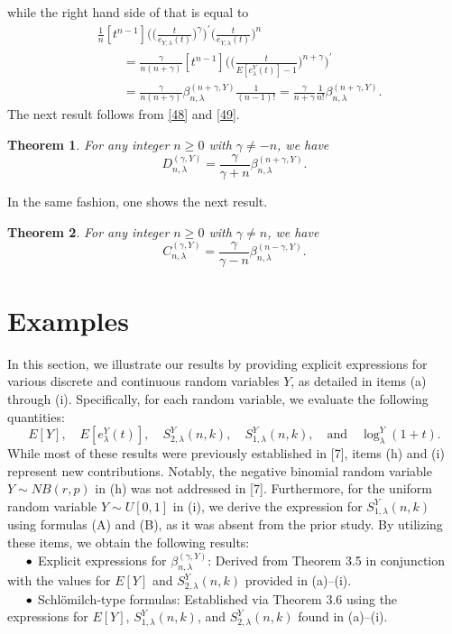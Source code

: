 \documentclass[a4paper,11pt]{amsart}
\newtheorem{theorem}{Theorem}[section]
\begin{document}
while the right hand side of that is equal to
\begin{equation} \label{49}
\begin{aligned}
&\frac{1}{n}[t^{n-1}]\bigg(\bigg(\frac{t}{e_{Y,\lambda}(t)}\bigg)^{\gamma}\bigg)^{\prime}\bigg(\frac{t}{e_{Y,\lambda}(t)}\bigg)^{n} \\
&\quad\quad =\frac{\gamma}{n(n+\gamma)}[t^{n-1}]\bigg(\bigg(\frac{t}{E[e_{\lambda}^{Y}(t)]-1}\bigg)^{n+\gamma}\bigg)^{\prime} \\
&\quad\quad=\frac{\gamma}{n(n+\gamma)}\beta_{n,\lambda}^{(n+\gamma,Y)}\frac{1}{(n-1)!}=\frac{\gamma}{n+\gamma}\frac{1}{n!}\beta_{n,\lambda}^{(n+\gamma,Y)}.
\end{aligned}
\end{equation}
The next result follows from \eqref{48} and \eqref{49}.
\begin{theorem}
For any integer $n \ge 0$ with $\gamma \ne - n$, we have
\begin{equation*}
D_{n,\lambda}^{(\gamma,Y)}=\frac{\gamma}{\gamma+n}\beta_{n,\lambda}^{(n+\gamma,Y)}.
\end{equation*}
\end{theorem}
In the same fashion, one shows the next result.
\begin{theorem}
For any integer $n \ge 0$ with $\gamma \ne n$, we have
\begin{equation*}
C_{n,\lambda}^{(\gamma,Y)}=\frac{\gamma}{\gamma-n}\beta_{n,\lambda}^{(n-\gamma,Y)}.
\end{equation*}
\end{theorem}

\section{Examples}
In this section, we illustrate our results by providing explicit expressions for various discrete and continuous random variables $Y$, as detailed in items (a) through (i). Specifically, for each random variable, we evaluate the following quantities:
\begin{equation*}
E[Y], \quad E[e_{\lambda}^{Y}(t)], \quad S_{2,\lambda}^{Y}(n,k), \quad S_{1,\lambda}^{Y}(n,k), \quad \text{and} \quad \log_{\lambda}^{Y}(1+t).
\end{equation*}
While most of these results were previously established in [7], items (h) and (i) represent new contributions. Notably, the negative binomial random variable $Y \sim NB(r,p)$ in (h) was not addressed in [7]. Furthermore, for the uniform random variable $Y \sim U[0,1]$ in (i), we derive the expression for $S_{1,\lambda}^{Y}(n,k)$ using formulas (A) and (B), as it was absent from the prior study. By utilizing these items, we obtain the following results: \\
$\indent \bullet$ Explicit expressions for $\beta_{n,\lambda}^{(\gamma,Y)}$: Derived from Theorem 3.5 in conjunction with the values for $E[Y]$ and $S_{2,\lambda}^{Y}(n,k)$ provided in (a)–(i). \\
$\indent \bullet$ Schl\"omilch-type formulas: Established via Theorem 3.6 using the expressions for $E[Y]$, $S_{1,\lambda}^{Y}(n,k)$, and $S_{2,\lambda}^{Y}(n,k)$ found in (a)–(i).
\end{document}
